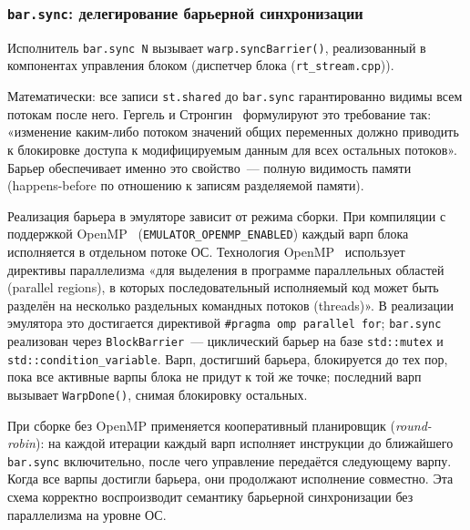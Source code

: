\subsubsection{\texttt{bar.sync}: делегирование барьерной синхронизации}

Исполнитель \texttt{bar.sync~N} вызывает
\texttt{warp.syncBarrier()}, реализованный в компонентах управления
блоком (диспетчер блока (\texttt{rt\_stream.cpp})).

Математически: все записи \texttt{st.shared} до \texttt{bar.sync}
гарантированно видимы всем потокам после него.
Гергель и Стронгин~\cite[с.~142]{GergelStrongin2003} формулируют это требование так:
«изменение каким-либо потоком значений общих переменных должно приводить
к блокировке доступа к модифицируемым данным для всех остальных потоков».
Барьер обеспечивает именно это свойство~--- полную видимость памяти
(happens-before по отношению к записям разделяемой памяти).

Реализация барьера в эмуляторе зависит от режима сборки.
При компиляции с поддержкой OpenMP~\cite{Kornyakov2010} (\texttt{EMULATOR\_OPENMP\_ENABLED})
каждый варп блока исполняется в отдельном потоке ОС.
Технология OpenMP~\cite[с.~141]{GergelStrongin2003} использует директивы параллелизма
«для выделения в программе параллельных областей (parallel regions), в которых
последовательный исполняемый код может быть разделён на несколько раздельных
командных потоков (threads)».
В реализации эмулятора это достигается директивой \texttt{\#pragma omp parallel for};
\texttt{bar.sync} реализован через \texttt{BlockBarrier}~--- циклический барьер
на базе \texttt{std::mutex} и \texttt{std::condition\_variable}.
Варп, достигший барьера, блокируется до тех пор, пока все активные
варпы блока не придут к той же точке; последний варп вызывает
\texttt{WarpDone()}, снимая блокировку остальных.

При сборке без OpenMP применяется кооперативный планировщик
(\textit{round-robin}): на каждой итерации каждый варп исполняет
инструкции до ближайшего \texttt{bar.sync} включительно, после чего
управление передаётся следующему варпу.
Когда все варпы достигли барьера, они продолжают исполнение совместно.
Эта схема корректно воспроизводит семантику барьерной синхронизации
без параллелизма на уровне ОС.

\newpage

